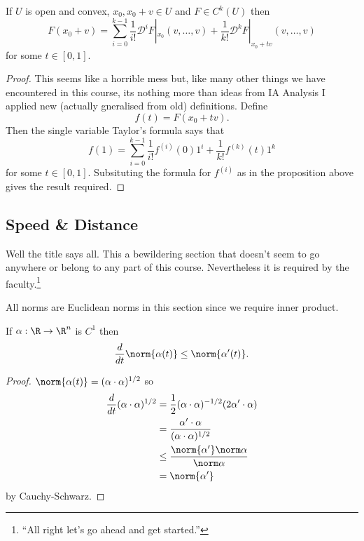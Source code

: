 \documentclass[a4paper]{article}
\newcommand*{\D}{\mathcal{D}}
\theoremstyle{definition}
\begin{document}
\begin{corollary}
  If \(U\) is open and convex, \(x_0, x_0 + v \in U\) and \(F \in C^k(U)\) then
  \[
    F(x_0 + v) = \sum_{i = 0}^{k - 1} \frac{1}{i!} \D^i F|_{x_0} (v, \dots, v) + \frac{1}{k!} \D^k F|_{x_0 + tv}(v, \dots, v)
  \]
  for some \(t \in [0, 1]\).
\end{corollary}

\begin{proof}
  This seems like a horrible mess but, like many other things we have encountered in this course, its nothing more than ideas from IA Analysis I applied new (actually gneralised from old) definitions. Define
  \[
    f(t) = F(x_0 + tv).
  \]
  Then the single variable Taylor's formula says that
  \[
    f(1) = \sum_{i = 0}^{k - 1} \frac{1}{i!} f^{(i)}(0) 1^i + \frac{1}{k!} f^{(k)}(t)1^k
  \]
  for some \(t \in [0, 1]\). Subsituting the formula for \(f^{(i)}\) as in the proposition above gives the result required.
\end{proof}

\subsection{Speed \& Distance}


Well the title says all. This a bewildering section that doesn't seem to go anywhere or belong to any part of this course. Nevertheless it is required by the faculty.\footnote{``All right let's go ahead and get started.''}

All norms are Euclidean norms in this section since we require inner product.

\begin{lemma}
  If \(\alpha: \R \to \R^n\) is \(C^1\) then
  \[
    \frac{d}{dt} \norm{\alpha(t)} \leq \norm{\alpha'(t)}.
  \]
\end{lemma}

\begin{proof}
  \(\norm{\alpha(t)} = (\alpha \cdot \alpha)^{1/2}\) so
  \begin{align*}
    \frac{d}{dt}(\alpha \cdot \alpha)^{1/2} &= \frac{1}{2} (\alpha \cdot \alpha)^{-1/2} (2\alpha' \cdot \alpha) \\
                                            &= \frac{\alpha' \cdot \alpha}{(\alpha \cdot \alpha)^{1/2}} \\
                                            &\leq \frac{\norm{\alpha'} \norm \alpha}{\norm \alpha} \\
                                            &= \norm{\alpha'}
  \end{align*}
  by Cauchy-Schwarz.
\end{proof}
\end{document}
